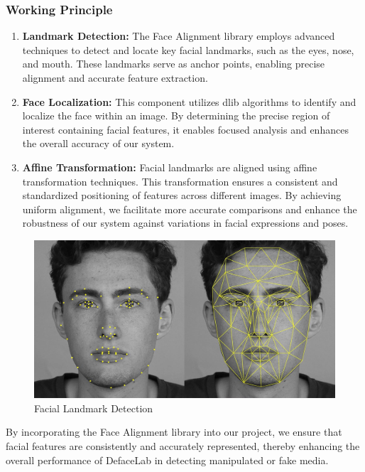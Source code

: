 \subsubsection{Working Principle}

\begin{enumerate}
    \item \textbf{Landmark Detection:} The Face Alignment library employs advanced techniques to detect and locate key facial landmarks, such as the eyes, nose, and mouth. These landmarks serve as anchor points, enabling precise alignment and accurate feature extraction.

    \item \textbf{Face Localization:} This component utilizes dlib algorithms to identify and localize the face within an image. By determining the precise region of interest containing facial features, it enables focused analysis and enhances the overall accuracy of our system.

    \item \textbf{Affine Transformation:} Facial landmarks are aligned using affine transformation techniques. This transformation ensures a consistent and standardized positioning of features across different images. By achieving uniform alignment, we facilitate more accurate comparisons and enhance the robustness of our system against variations in facial expressions and poses.

\end{enumerate}

\begin{figure}[htbp]
    \centering
    \includegraphics[width=5in]{img/facial feature.jpg}
    \caption{Facial Landmark Detection}
\end{figure}

By incorporating the Face Alignment library into our project, we ensure that facial features are consistently and accurately represented, thereby enhancing the overall performance of DefaceLab in detecting manipulated or fake media.\\